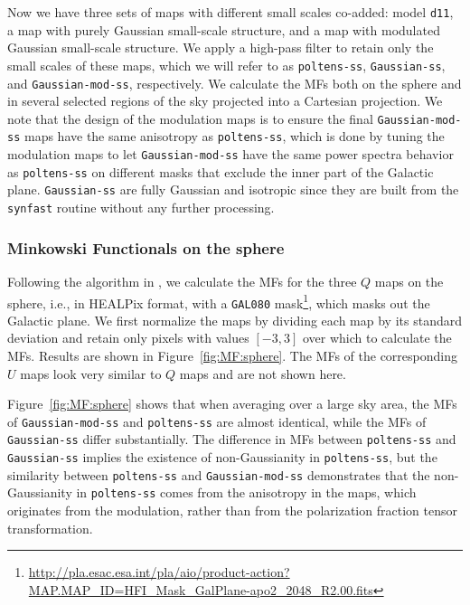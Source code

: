 \documentclass[twocolumn]{aastex631}
\begin{document}
Now we have three sets of maps with different small scales co-added: model \texttt{d11}, a map with purely Gaussian small-scale structure, and a map with modulated Gaussian small-scale structure. %
We apply a high-pass filter to retain only the small scales of these maps, which we will refer to as \texttt{poltens-ss}, \texttt{Gaussian-ss}, and \texttt{Gaussian-mod-ss}, respectively. We calculate the MFs both on the sphere and in several selected regions of the sky projected into a Cartesian projection. We note that the design of the modulation maps is to ensure the final \texttt{Gaussian-mod-ss} maps have the same anisotropy as \texttt{poltens-ss}, which is done by tuning the modulation maps to let \texttt{Gaussian-mod-ss} have the same power spectra behavior as \texttt{poltens-ss} on different masks that exclude the inner part of the Galactic plane. \texttt{Gaussian-ss} are fully Gaussian and isotropic since they are built from the \texttt{synfast} routine without any further processing. 


\subsubsection{Minkowski Functionals on the sphere}

Following the algorithm in \cite{Grewal:2022}, we calculate the MFs for the three $Q$ maps on the sphere, i.e., in HEALPix format, with a \texttt{GAL080} mask\footnote{\url{http://pla.esac.esa.int/pla/aio/product-action?MAP.MAP_ID=HFI_Mask_GalPlane-apo2_2048_R2.00.fits}}, which masks out the Galactic plane. We first normalize the maps by dividing each map by its standard deviation and retain only pixels with values $[-3, 3]$ over which to calculate the MFs. Results are shown in Figure~\ref{fig:MF:sphere}. The MFs of the corresponding $U$ maps look very similar to $Q$ maps and are not shown here.

Figure~\ref{fig:MF:sphere} shows that when averaging over a large sky area, the MFs of \texttt{Gaussian-mod-ss} and \texttt{poltens-ss} are almost identical, while the MFs of \texttt{Gaussian-ss} differ substantially. The difference in MFs between \texttt{poltens-ss} and \texttt{Gaussian-ss} implies the existence of non-Gaussianity in \texttt{poltens-ss}, but the similarity between \texttt{poltens-ss} and \texttt{Gaussian-mod-ss} demonstrates that the non-Gaussianity in \texttt{poltens-ss} comes from the anisotropy in the maps, which originates from the modulation, rather than from the polarization fraction tensor transformation.
\end{document}
